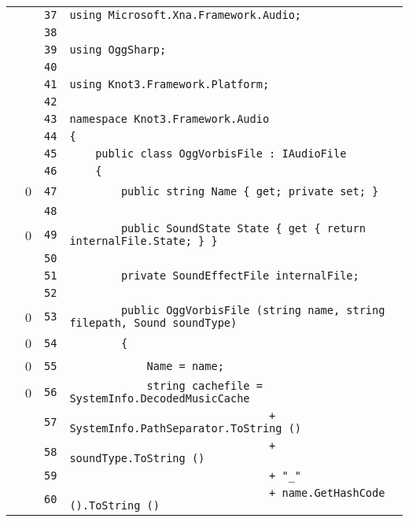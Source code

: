 \documentclass[a4paper,10pt]{article}
\begin{document}
\begin{longtable}[l]{lrrl}
\cellcolor{gray} &  & \verb~37~ & \verb~using Microsoft.Xna.Framework.Audio;~\\
\cellcolor{gray} &  & \verb~38~ & \verb~~\\
\cellcolor{gray} &  & \verb~39~ & \verb~using OggSharp;~\\
\cellcolor{gray} &  & \verb~40~ & \verb~~\\
\cellcolor{gray} &  & \verb~41~ & \verb~using Knot3.Framework.Platform;~\\
\cellcolor{gray} &  & \verb~42~ & \verb~~\\
\cellcolor{gray} &  & \verb~43~ & \verb~namespace Knot3.Framework.Audio~\\
\cellcolor{gray} &  & \verb~44~ & \verb~{~\\
\cellcolor{gray} &  & \verb~45~ & \verb~    public class OggVorbisFile : IAudioFile~\\
\cellcolor{gray} &  & \verb~46~ & \verb~    {~\\
\cellcolor{red} & 0 & \verb~47~ & \verb~        public string Name { get; private set; }~\\
\cellcolor{gray} &  & \verb~48~ & \verb~~\\
\cellcolor{red} & 0 & \verb~49~ & \verb~        public SoundState State { get { return internalFile.State; } }~\\
\cellcolor{gray} &  & \verb~50~ & \verb~~\\
\cellcolor{gray} &  & \verb~51~ & \verb~        private SoundEffectFile internalFile;~\\
\cellcolor{gray} &  & \verb~52~ & \verb~~\\
\cellcolor{red} & 0 & \verb~53~ & \verb~        public OggVorbisFile (string name, string filepath, Sound soundType)~\\
\cellcolor{red} & 0 & \verb~54~ & \verb~        {~\\
\cellcolor{red} & 0 & \verb~55~ & \verb~            Name = name;~\\
\cellcolor{red} & 0 & \verb~56~ & \verb~            string cachefile = SystemInfo.DecodedMusicCache~\\
\cellcolor{gray} &  & \verb~57~ & \verb~                               + SystemInfo.PathSeparator.ToString ()~\\
\cellcolor{gray} &  & \verb~58~ & \verb~                               + soundType.ToString ()~\\
\cellcolor{gray} &  & \verb~59~ & \verb~                               + "_"~\\
\cellcolor{gray} &  & \verb~60~ & \verb~                               + name.GetHashCode ().ToString ()~\\

\end{longtable}
\end{document}
